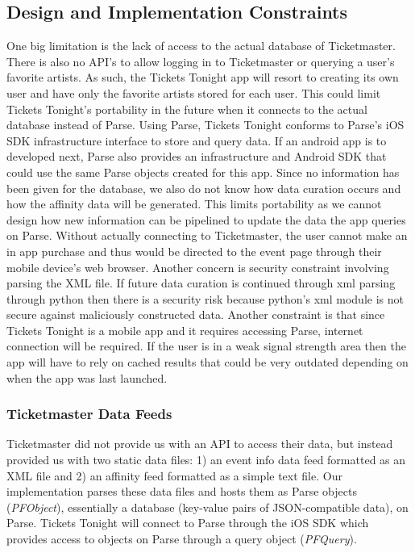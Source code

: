 		  \subsection{Design and Implementation Constraints}
		   One big limitation is the lack of access to the actual database of Ticketmaster. There is also no API’s 
		   to allow logging in to Ticketmaster or querying a user’s favorite artists. As such, the Tickets Tonight 
		   app will resort to creating its own user and have only the favorite artists stored for each user. This 
		   could limit Tickets Tonight’s portability in the future when it connects to the actual database instead 
		   of Parse. Using Parse, Tickets Tonight conforms to Parse’s iOS SDK infrastructure interface to store 
		   and query data. If an android app is to developed next, Parse also provides an infrastructure and 
		   Android SDK that could use the same Parse objects created for this app. Since no information has been 
		   given for the database, we also do not know how data curation occurs and how the affinity data will be 
		   generated. This limits portability as we cannot design how new information can be pipelined to update 
		   the data the app queries on Parse. Without actually connecting to Ticketmaster, the user cannot make 
		   an in app purchase and thus would be directed to the event page through their mobile device’s web 
		   browser. Another concern is security constraint involving parsing the XML file. If future data curation 
		   is continued through xml parsing through python then there is a security risk because python’s xml 
		   module is not secure against maliciously constructed data. Another constraint is that since Tickets 
		   Tonight is a mobile app and it requires accessing Parse, internet connection will be required. If the 
		   user is in a weak signal strength area then the app will have to rely on cached results that could be 
		   very outdated depending on when the app was last launched. 
		  
		    \subsubsection{Ticketmaster Data Feeds}
		     Ticketmaster did not provide us with an API to access their data, but instead provided us with two 
		     static data files: 1) an event info data feed formatted as an XML file and 2) an affinity feed formatted 
		     as a simple text file. Our implementation parses these data files and hosts them as Parse objects 
		     (\textit{PFObject}), essentially a database  (key-value pairs of JSON-compatible data), on Parse. Tickets 
		     Tonight will connect to Parse through the iOS SDK which provides access to objects on Parse through 
		     a query object (\textit{PFQuery}).
		     
